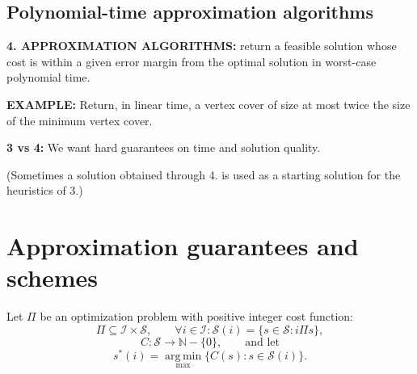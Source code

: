 \subsection{Polynomial-time approximation algorithms}
\textbf{4. APPROXIMATION ALGORITHMS:} return a feasible solution whose cost is within a given error margin from the optimal solution in worst-case polynomial time.

\textbf{EXAMPLE:} Return, in linear time, a vertex cover of size at most twice the size of the minimum vertex cover.

\textbf{3 vs 4:} We want hard guarantees on time and solution quality.

(Sometimes a solution obtained through 4. is used as a starting solution for the heuristics of 3.)

\section{Approximation guarantees and schemes}
Let $\Pi$ be an optimization problem with positive integer cost function:
\[\Pi\subseteq\mathcal I\times\mathcal S,\qquad\forall i\in\mathcal I:\mathcal S(i)=\{s\in\mathcal S:i\Pi s\},\]
\[C:\mathcal S\to\mathbb N-\{0\},\qquad\text{and let}\]
\[s^*(i)=\underset{\max}{\operatorname{arg\,min}}\{C(s):s\in\mathcal S(i)\}.\]
